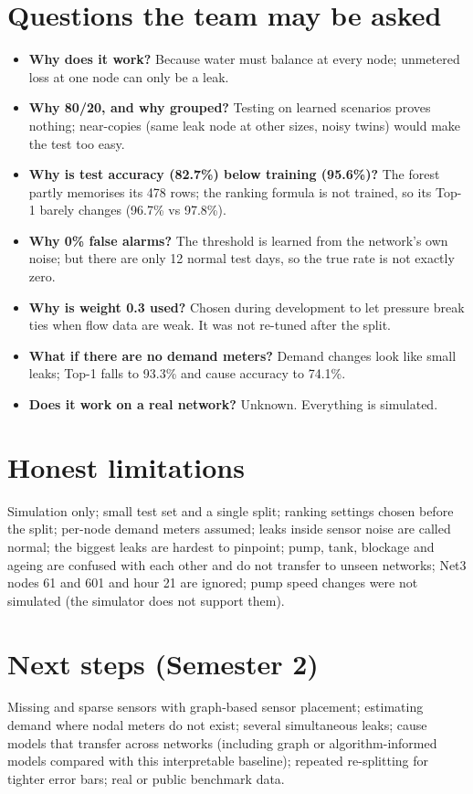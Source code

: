 \documentclass[11pt,a4paper]{article}
\begin{document}
\section{Questions the team may be asked}
\begin{itemize}
\item \textbf{Why does it work?} Because water must balance at every node; unmetered loss at one node can only be a leak.
\item \textbf{Why 80/20, and why grouped?} Testing on learned scenarios proves nothing; near-copies (same leak node at other sizes, noisy twins) would make the test too easy.
\item \textbf{Why is test accuracy (82.7\%) below training (95.6\%)?} The forest partly memorises its 478 rows; the ranking formula is not trained, so its Top-1 barely changes (96.7\% vs 97.8\%).
\item \textbf{Why 0\% false alarms?} The threshold is learned from the network's own noise; but there are only 12 normal test days, so the true rate is not exactly zero.
\item \textbf{Why is weight 0.3 used?} Chosen during development to let pressure break ties when flow data are weak. It was not re-tuned after the split.
\item \textbf{What if there are no demand meters?} Demand changes look like small leaks; Top-1 falls to 93.3\% and cause accuracy to 74.1\%.
\item \textbf{Does it work on a real network?} Unknown. Everything is simulated.
\end{itemize}

\section{Honest limitations}
Simulation only; small test set and a single split; ranking settings chosen before the split; per-node demand meters assumed; leaks inside sensor noise are called normal; the biggest leaks are hardest to pinpoint; pump, tank, blockage and ageing are confused with each other and do not transfer to unseen networks; Net3 nodes 61 and 601 and hour 21 are ignored; pump speed changes were not simulated (the simulator does not support them).

\section{Next steps (Semester 2)}
Missing and sparse sensors with graph-based sensor placement; estimating demand where nodal meters do not exist; several simultaneous leaks; cause models that transfer across networks (including graph or algorithm-informed models compared with this interpretable baseline); repeated re-splitting for tighter error bars; real or public benchmark data.
\end{document}
